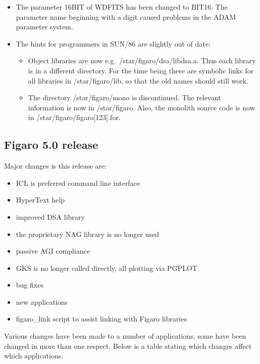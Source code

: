 \documentclass[11pt,twoside]{article}
\begin{document}
\begin{itemize}
\item
   The parameter 16BIT of WDFITS has been changed to BIT16. The
   parameter name beginning with a digit caused problems in the ADAM
   parameter system.

\item
   The hints for programmers in SUN/86 are slightly out of date:

\begin{itemize}
\item
      Object libraries are now e.g.\ /star/figaro/dsa/libdsa.a. Thus each
      library is in a different directory. For the time being there are
      symbolic links for all libraries in /star/figaro/lib, so that the
      old names should still work.
\item
      The directory /star/figaro/mono is discontinued. The relevant
      information is now in /star/figaro. Also, the monolith source code
      is now in /star/figaro/figaro[123].for.

\end{itemize}

\end{itemize}


\subsection{\label{news50}Figaro 5.0 release}

   Major changes is this release are:

\begin{itemize}
\item ICL is preferred command line interface
\item HyperText help
\item improved DSA library
\item the proprietary NAG library is no longer used
\item passive AGI compliance
\item GKS is no longer called directly, all plotting via PGPLOT
\item bug fixes
\item new applications
\item figaro\_link script to assist linking with Figaro libraries
\end{itemize}

   Various changes have been made to a number of applications, some have
   been changed in more than one respect. Below is a table stating which
   changes affect which applications.
\end{document}
